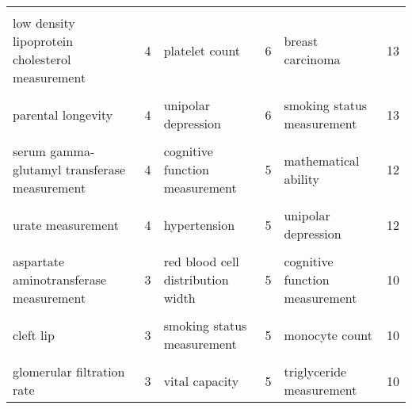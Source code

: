 \begin{table}[H]
{\begin{tabular}[t]{lrlrlr}
\cellcolor{gray!6}{high density lipoprotein cholesterol measurement} & \cellcolor{gray!6}{4} & \cellcolor{gray!6}{hemoglobin measurement} & \cellcolor{gray!6}{6} & \cellcolor{gray!6}{bipolar disorder} & \cellcolor{gray!6}{13}\\
low density lipoprotein cholesterol measurement & 4 & platelet count & 6 & breast carcinoma & 13\\
\cellcolor{gray!6}{myocardial infarction} & \cellcolor{gray!6}{4} & \cellcolor{gray!6}{pulse pressure measurement} & \cellcolor{gray!6}{6} & \cellcolor{gray!6}{intelligence} & \cellcolor{gray!6}{13}\\
parental longevity & 4 & unipolar depression & 6 & smoking status measurement & 13\\
\cellcolor{gray!6}{platelet count} & \cellcolor{gray!6}{4} & \cellcolor{gray!6}{C-reactive protein measurement} & \cellcolor{gray!6}{5} & \cellcolor{gray!6}{Alzheimer's disease} & \cellcolor{gray!6}{12}\\
serum gamma-glutamyl transferase measurement & 4 & cognitive function measurement & 5 & mathematical ability & 12\\
\cellcolor{gray!6}{unipolar depression} & \cellcolor{gray!6}{4} & \cellcolor{gray!6}{heel bone mineral density} & \cellcolor{gray!6}{5} & \cellcolor{gray!6}{systolic blood pressure} & \cellcolor{gray!6}{12}\\
urate measurement & 4 & hypertension & 5 & unipolar depression & 12\\
\cellcolor{gray!6}{Cleft palate} & \cellcolor{gray!6}{3} & \cellcolor{gray!6}{intelligence} & \cellcolor{gray!6}{5} & \cellcolor{gray!6}{coronary artery disease} & \cellcolor{gray!6}{11}\\
aspartate aminotransferase measurement & 3 & red blood cell distribution width & 5 & cognitive function measurement & 10\\
\cellcolor{gray!6}{body height} & \cellcolor{gray!6}{3} & \cellcolor{gray!6}{sex hormone-binding globulin measurement} & \cellcolor{gray!6}{5} & \cellcolor{gray!6}{eosinophil count} & \cellcolor{gray!6}{10}\\
cleft lip & 3 & smoking status measurement & 5 & monocyte count & 10\\
\cellcolor{gray!6}{eosinophil count} & \cellcolor{gray!6}{3} & \cellcolor{gray!6}{visceral adipose tissue measurement} & \cellcolor{gray!6}{5} & \cellcolor{gray!6}{sleep duration} & \cellcolor{gray!6}{10}\\
glomerular filtration rate & 3 & vital capacity & 5 & triglyceride measurement & 10\\

\end{tabular}}
\end{table}
